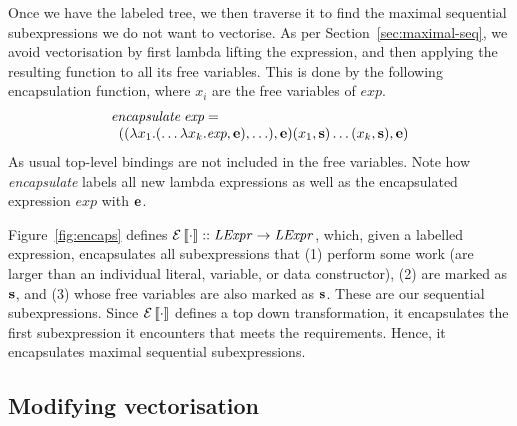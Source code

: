 %
Once we have the labeled tree, we then traverse it to find the maximal sequential subexpressions we do not want to vectorise. As per Section~\ref{sec:maximal-seq}, we avoid vectorisation by first lambda lifting the expression, and then applying the resulting function to all its free variables. This is done by the following encapsulation function, where $x_i$ are the free variables of $exp$.
$$
\begin{array}{l}
  \textit{encapsulate} \;\textit{exp} = \\
  \;\;((\lambda{x_{1}}.(\ldots \lambda{x_k}.\textit{exp} , \mathbf{e}),\ldots), \mathbf{e})(x_{1}, \mathbf{s})\ldots(x_{k}, \mathbf{s}), \mathbf{e})
\end{array}
$$
As usual top-level bindings are not included in the free variables. Note how \textit{encapsulate} labels all new lambda expressions as well as the encapsulated expression $\textit{exp}$ with $\mathbf{e}$. 

Figure~\ref{fig:encaps} defines \(\mathcal{E}\left\llbracket \cdot \right\rrbracket :: \mathit{LExpr} \to \mathit{LExpr}\), which, given a labelled expression, encapsulates all subexpressions that (1) perform some work (are larger than an individual literal, variable, or data constructor), (2) are marked as $\mathbf{s}$, and (3) whose free variables are also marked as $\mathbf{s}$. These are our sequential subexpressions. Since $\mathcal{E}\left\llbracket \cdot \right\rrbracket$ defines a top down transformation, it encapsulates the first subexpression it encounters that meets the requirements. Hence, it encapsulates maximal sequential subexpressions.

\subsection{Modifying vectorisation}

